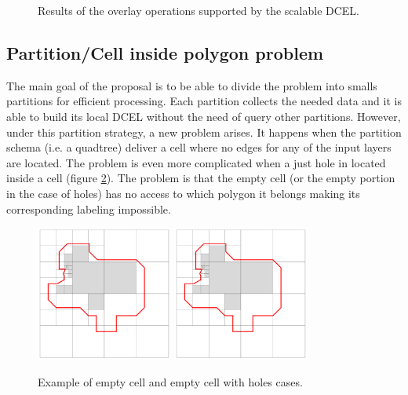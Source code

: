 \begin{figure}[!ht]
    \centering
    
    \caption{Results of the overlay operations supported by the scalable DCEL.}\label{fig:overlay_operations}
\end{figure}

\subsection{Partition/Cell inside polygon problem}
The main goal of the proposal is to be able to divide the problem into smalls partitions for efficient processing.  Each partition collects the needed data and it is able to build its local DCEL without the need of query other partitions.  However, under this partition strategy, a new problem arises.  It happens when the partition schema (i.e. a quadtree) deliver a cell where no edges for any of the input layers are located.  The problem is even more complicated when a just hole in located inside a cell (figure \ref{fig:emptycells}).  The problem is that the empty cell (or the empty portion in the case of holes) has no access to which polygon it belongs making its corresponding labeling impossible.  

\begin{figure}[!ht]
    \centering
    \includegraphics[page=1, width=0.4\textwidth]{figures/cellinpolygon/emptycells.pdf}
    \includegraphics[page=2, width=0.4\textwidth]{figures/cellinpolygon/emptycells.pdf}
    \caption{Example of empty cell and empty cell with holes cases.}\label{fig:emptycells}
\end{figure}

